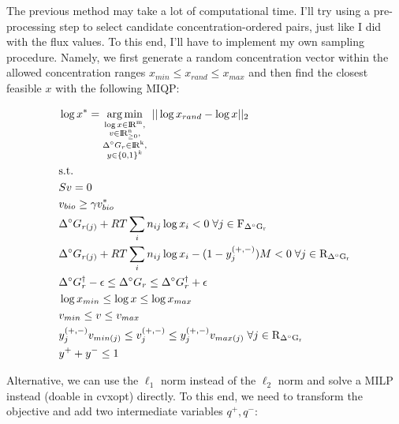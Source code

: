 \documentclass[12pt]{article}
\DeclareMathOperator*{\argmin}{arg\,min}
\begin{document}
  The previous method may take a lot of computational time. I'll try using a pre-processing step to select candidate concentration-ordered pairs, just like I did with the flux values. To this end, I'll have to implement my own sampling procedure. Namely, we first generate a random concentration vector within the allowed concentration ranges $x_{min} \leq x_{rand} \leq x_{max}$ and then find the closest feasible $x$ with the following MIQP:

  \begin{align}
    \begin{aligned}
      \label{eq:9}
      &\log x^* = \argmin_{\substack{ \log{x} \in \rm I\!R^m, \\
                            v \in \rm I\!R^n_{\geq 0}, \\
                            \Delta^{\circ} G_{r} \in \rm I\!R^k, \\
                            y \in \{0, 1\}^k }} \; ||\log{x_{rand}} - \log{x}||_2
      \\
      &\mathrm{s.t.}
      \\
      &Sv = 0
      \\
      &v_{bio} \geq \gamma v^*_{bio}
      \\
      &\Delta^{\circ} G_{r(j)} + RT \sum_i n_{ij} \log{x_i} < 0 \; \forall j \in \mathrm{F_{\Delta^{\circ} G_{r}}}
      \\
      &\Delta^{\circ} G_{r(j)} + RT \sum_i n_{ij} \log{x_i} - (1 - y_j^{(+, -)})M< 0 \; \forall j \in \mathrm{R_{\Delta^{\circ} G_{r}}}
      \\
      &\Delta^{\circ} G_{r}^{\dagger} - \epsilon \leq \Delta^{\circ} G_{r} \leq \Delta^{\circ} G_{r}^{\dagger} + \epsilon
      \\
      &\log{x}_{min} \leq \log{x} \leq \log{x}_{max}
      \\
      &v_{min} \leq v \leq v_{max}
      \\
      &y_j^{(+, -)} v_{min(j)} \leq v^{(+, -)}_j \leq y_j^{(+, -)} v_{max(j)} \; \forall j \in \mathrm{R_{\Delta^{\circ} G_{r}}}
      \\
      &y^+ + y^- \leq 1
    \end{aligned}
  \end{align}

  Alternative, we can use the $\ell_{1}$ norm instead of the $\ell_{2}$ norm and solve a MILP instead (doable in cvxopt) directly. To this end, we need to transform the objective and add two intermediate variables $q^+, q^-$:
\end{document}
